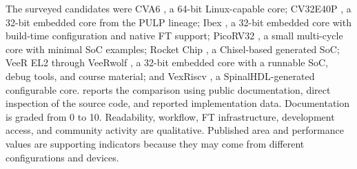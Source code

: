 The surveyed candidates were CVA6 \cite{CVA6}, a 64-bit Linux-capable core; CV32E40P \cite{cv32e40p}, a 32-bit embedded core from the PULP lineage; Ibex \cite{ibex}, a 32-bit embedded core with build-time configuration and native \ac{FT} support; PicoRV32 \cite{picorv32}, a small multi-cycle core with minimal \ac{SoC} examples; Rocket Chip \cite{rocket_chip}, a Chisel-based generated \ac{SoC}; VeeR EL2 through VeeRwolf \cite{VeeRwolf}, a 32-bit embedded core with a runnable \ac{SoC}, debug tools, and course material; and VexRiscv \cite{vexriscv}, a SpinalHDL-generated configurable core.  reports the comparison using public documentation, direct inspection of the source code, and reported implementation data. Documentation is graded from 0 to 10. Readability, workflow, \ac{FT} infrastructure, development access, and community activity are qualitative. Published area and performance values are supporting indicators because they may come from different configurations and devices.




